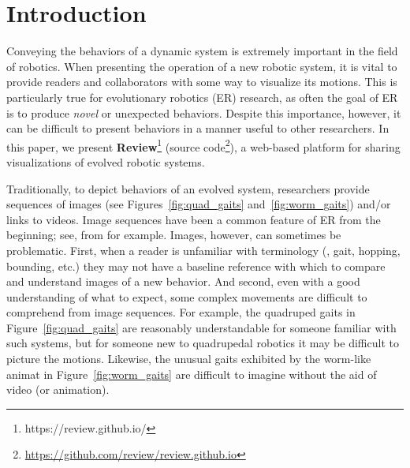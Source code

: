 \section{Introduction}

Conveying the behaviors of a dynamic system is extremely important in the field of robotics.
%
When presenting the operation of a new robotic system, it is vital to provide readers and collaborators with some way to visualize its motions.
%
This is particularly true for evolutionary robotics (ER) research, as
%
often the goal of ER is to produce \emph{novel} or unexpected behaviors.
%
Despite this importance, however, it can be difficult to present behaviors in a manner useful to other researchers.
%
In this paper, we present \textbf{Review}\footnote{https://review.github.io/} (source code\footnote{\url{https://github.com/review/review.github.io}}), a web-based platform for sharing visualizations of evolved robotic systems.




Traditionally, to depict behaviors of an evolved system, researchers provide sequences of images (see Figures~\ref{fig:quad_gaits} and~\ref{fig:worm_gaits}) and/or links to videos.
%
Image sequences have been a common feature of ER from the beginning; see, \textcite{Sims.1994.CGIT.Creatures} from \citeyear{Sims.1994.CGIT.Creatures} for example.
%
Images, however, can sometimes be problematic. First, when a reader is unfamiliar with terminology (\eg{}, gait, hopping, bounding, etc.) they may not have a baseline reference with which to compare and understand images of a new behavior.
%
And second, even with a good understanding of what to expect, some complex movements are difficult to comprehend from image sequences.
%
For example, the quadruped gaits in Figure~\ref{fig:quad_gaits} are reasonably understandable for someone familiar with such systems, but for someone new to quadrupedal robotics it may be difficult to picture the motions.
%
Likewise, the unusual gaits exhibited by the worm-like animat in Figure~\ref{fig:worm_gaits} are difficult to imagine without the aid of video (or animation).



